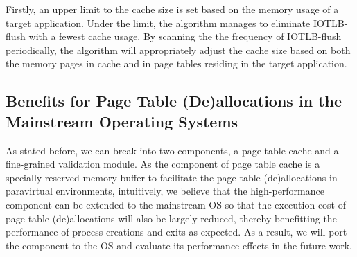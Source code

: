 Firstly, an upper limit to the cache size is set based on the memory usage of a target application. Under the limit, the algorithm manages to eliminate IOTLB-flush with a fewest cache usage. By scanning the the frequency of IOTLB-flush periodically, the algorithm will appropriately adjust the cache size based on both the memory pages in cache and in page tables residing in the target application.



\subsection{Benefits for Page Table (De)allocations in the Mainstream Operating Systems}

As stated before, we can break \name into two components, a page table cache and a fine-grained validation module. As the component of page table cache is a specially reserved memory buffer to facilitate the page table (de)allocations in paravirtual environments, intuitively, we believe that the high-performance component can be extended to the mainstream OS so that the execution cost of page table (de)allocations will also be largely reduced, thereby benefitting the performance of process creations and exits as expected. As a result, we will port the component to the OS and evaluate its performance effects in the future work.


